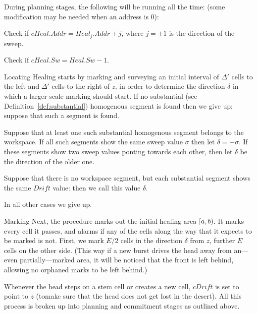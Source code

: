 \documentclass[12pt]{memoir}
\newcommand{\authnote}[3]
{\text{{ \textcolor{#3}{\( \langle\hspace{-0.2em}\langle \)\textsf{\footnotesize #1: #2}\( \rangle\hspace{-0.2em}\rangle \)}}}}
\newcommand{\authnote}[2]{}
\newcommand{\Pnote}[1]{{\authnote{Peter}{#1}{cyan}}}
\newcommand{\fld}[1]{\ensuremath{\textit{#1}}}
\newcommand{\E}{E}
\newcommand{\z}{z}
\newcommand{\Addr}{\fld{Addr}}
\newcommand{\Drift}{\fld{Drift}}
\newcommand{\cDrift}{\fld{cDrift}}
\newcommand{\Heal}{\fld{Heal}}
\newcommand{\cHeal}{\fld{cHeal}}
\newcommand{\Sweep}{\fld{Sw}}
\begin{document}
During planning stages, the following  will be running
all the time: (some modification may be needed when an address is 0): \Pnote{!}
        \begin{bullets}
                  \item Check if \( \cHeal.\Addr = \Heal_{j}.\Addr + j \), where
                        \( j = \pm 1 \) is the direction of the sweep.
                  \item 
                        Check if \( \cHeal.\Sweep = \Heal.\Sweep -1 \).
              \end{bullets}
\begin{flushdescription}

\item[Locating]
Healing starts by marking and surveying an initial interval of \( \Delta' \) cells
to the left and \( \Delta' \) cells to the right of \( \z \), in order
to determine the direction \( \delta \) in which a larger-scale marking should start.
If no substantial (see Definition~\ref{def:substantial}) 
homogenous segment is found then we give up;
suppose that such a segment is found.

Suppose that at least one such substantial homogenous segment belongs to the workspace.
If all such segments show the same sweep value \( \sigma \)
then let \( \delta=-\sigma \).
If these segments show two sweep values ponting towards each other, then
let \( \delta \) be the direction of the older one.

Suppose that there is no workspace segment, but each substantial segment
shows the same \( \Drift \) value: then we call this value \( \delta \).

In all other cases we give up.

\item[Marking]
Next, the procedure marks out the initial healing area \( [a,b) \).
It marks every cell it passes, and alarms if any of the cells
along the way that it expects to be marked is not.
First, we mark \( \E/2 \) cells in the direction \( \delta \)
from \( \z \), further \( \E \) cells on the other side.
(This way if a new burst drives the head away from 
an---even partially---marked area, it will be noticed that the
front is left behind, allowing no orphaned marks to be left behind.)

Whenever the head steps on a stem cell or creates a new cell, 
\( \cDrift \) is set to point to \( \z \) (tomake sure that the head does not get
lost in the desert).
All this process is broken up into planning and commitment stages as outlined
above.


\end{flushdescription}
\end{document}
